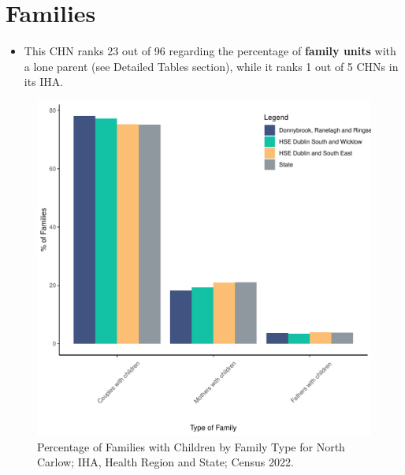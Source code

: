 \documentclass{article}
\begin{document}
\section{Families}\label{sect:Fam}
\begin{itemize}
\item This CHN ranks  23 out of 96 regarding the percentage of \textbf{family units} with a lone parent (see Detailed Tables section), while it ranks   1 out of 5 CHNs in its IHA.
\end{itemize}
\begin{figure}[H]
	\centering
	\includegraphics[width = 150mm]{../figures/FamED.pdf}
	\caption{Percentage of Families with Children by Family Type for North Carlow; IHA, Health Region and State; Census 2022.}
	\label{fig:vbnv}
	\end{figure}
	
\end{document}
